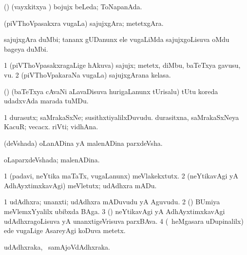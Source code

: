 \noindent
\gl{\pagu}
\expl{}
\bmng
{}  (\hA) (vayxkitxya \vi) bojujx beLeda; ToNapanAda. 
\emng
\eentry

\bentry
{} 
\gl{\nA}
\expl{}
\bmng
(piVThoVpasakxra \mo vugaLa) sajujxgAra; metetxgAra. 
\emng
\eentry

\bentry
{} 
\gl{\nA}
\expl{}
\bmng
sajujxgAra duMbi; tananx gUDanunx ele \mo vugaLiMda sajujxgoLisuva oMdu bageya duMbi. 
\emng
\eentry

\bentry
{} 
\gl{\nA}
\expl{}
\bmng
\bnum
\num{1} (piVThoVpasakxragaLige hAkuva) sajujx; metetx, diMbu, baTeTxya gavusu, \mo vu. 
\num{2} (piVThoVpakaraNa \mo vugaLa) sajujxgArana kelasa. 
\enum
\emng
\eentry

\bentry
{} 
\gl{\nA}
\expl{}
\bmng
(\nw) (baTeTxya cAvaNi aLavaDisuva hurigaLanunx tUrisalu) tUtu koreda udadxvAda marada tuMDu. 
\emng
\eentry

\bentry
{} 
\gl{\nA}
\bmng
\bnum
\num{1} durasutx; saMrakaSxNe; susithxtiyalilxDuvudu. 
 durasitxna, saMrakaSxNeya 
\banum
{} KacuR; vecacx. 
 riVti; vidhAna. 
\eanum
\numie
\enum
\emng
\eentry

\bentry
{} 
\gl{\nA}
\expl{}
\bmng
(deVshada) oLanADina yA malenADina parxdeVsha. 
\emng
\eentry

\bentry
{} 
\gl{\gu}
\expl{}
\bmng
oLaparxdeVshada; malenADina. 
\emng
\eentry

\bentry
{} 
\gl{\sakirx}
\expl{}
\bmng
\bnum
\num{1} (padavi, neYtika maTaTx, \mo vugaLanunx) meVlakekxtutx. 
\num{2} (neYtikavAgi yA AdhAyxtimxkavAgi) meVletutx; udAdhxra mADu. 
\enum
\emng
\eentry

\bentry
{} 
\gl{\nA}
\expl{}
\bmng
\bnum
\num{1} udAdhxra; unanxti; udAdhxra mADuvudu yA Aguvudu. 
\num{2} (\BUvi) BUmiya meVlemxYyalilx ubibxda BAga. 
\num{3} (\AmA) neYtikavAgi yA AdhAyxtimxkavAgi udAdhxragoLisuva yA unanxtigeVrisuva parxBAva. 
\num{4} (\kanmu\ heMgasara uDupinalilx) ede \mo vugaLige AsareyAgi koDuva metetx. 
\enum
\emng
\eentry

\bentry
{} 
\gl{\nA}
\expl{}
\bmng
udAdhxraka, \kanmu\ samAjoVdAdhxraka. 
\emng
\eentry

